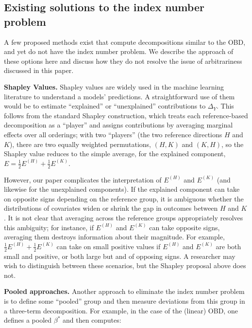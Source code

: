 \subsection{Existing solutions to the index number problem}
\label{sec:existing_index_number}
A few proposed methods exist that compute decompositions similar to the OBD, and yet do not have the index number problem.
We describe the approach of these options here and discuss how they do not resolve the issue of arbitrariness discussed in this paper.

\textbf{Shapley Values.} Shapley values \citep{Shapley1953} are widely used in the machine learning literature to understand a models' predictions.
A straightforward use of them would be to estimate ``explained'' or ``unexplained'' contributions to $\Delta_Y$.
This follows from the standard Shapley construction, which treats each reference-based decomposition as a ``player'' and assigns contributions by averaging marginal effects over all orderings; with two ``players'' (the two reference directions $H$ and $K$), there are two equally weighted permutations, $(H,K)$ and $(K,H)$, so the Shapley value reduces to the simple average, for the explained component, $E = \tfrac{1}{2}E^{(H)} + \tfrac{1}{2}E^{(K)}$.

However, our paper complicates the interpretation of $E^{(H)}$ and $E^{(K)}$ (and likewise for the unexplained components). 
If the explained component can take on opposite signs depending on the reference group, it is ambiguous whether the distributions of covariates widen or shrink the gap in outcomes between $H$ and $K$.
It is not clear that averaging across the reference groups appropriately resolves this ambiguity; for instance, if $E^{(H)}$ and $E^{(K)}$ can take opposite signs, averaging them destroys information about their magnitude.
For example, $\tfrac{1}{2}E^{(H)} + \tfrac{1}{2}E^{(K)}$ can take on small positive values if $E^{(H)}$ and $E^{(K)}$ are both small and positive, or both large but and of opposing signs. 
A researcher may wish to distinguish between these scenarios, but the Shapley proposal above does not.

\textbf{Pooled approaches.}
Another approach to eliminate the index number problem is to define some ``pooled'' group and then measure deviations from this group in a three-term decomposition. For example, in the case of the (linear) OBD, one defines a pooled $\beta^*$ and then computes:

